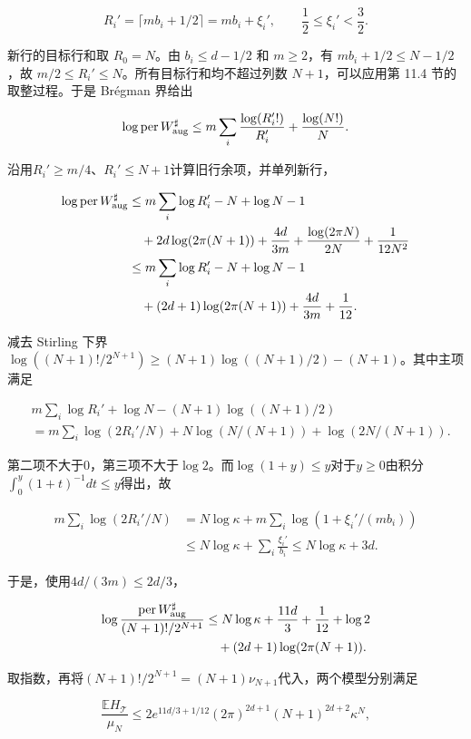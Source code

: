 \documentclass[11pt,a4paper]{article}
\begin{document}
\[
R_i'=\lceil mb_i+1/2\rceil=mb_i+\xi_i',
\qquad \frac12\le\xi_i'<\frac32.
\]

新行的目标行和取 \(R_0=N\)。由 \(b_i\le d-1/2\) 和 \(m\ge2\)，有 \(mb_i+1/2\le N-1/2\)，故 \(m/2\le R_i'\le N\)。所有目标行和均不超过列数 \(N+1\)，可以应用第 11.4 节的取整过程。于是 Brégman 界给出

\[
\log\operatorname{per}W^\sharp_{\rm aug}
\le m\sum_i\frac{\log(R_i'!)}{R_i'}
+\frac{\log(N!)}N.
\]

沿用\(R_i'\ge m/4\)、\(R_i'\le N+1\)计算旧行余项，并单列新行，

\[
\begin{aligned}
\log\operatorname{per}W^\sharp_{\rm aug}
&\le m\sum_i\log R_i'-N+\log N-1\\
&\quad+2d\log(2\pi(N+1))+\frac{4d}{3m}
+\frac{\log(2\pi N)}{2N}+\frac1{12N^2}\\
&\le m\sum_i\log R_i'-N+\log N-1\\
&\quad+(2d+1)\log(2\pi(N+1))+\frac{4d}{3m}+\frac1{12}.
\end{aligned}
\]

减去 Stirling 下界 \(\log((N+1)!/2^{N+1})\ge(N+1)\log((N+1)/2)-(N+1)\)。其中主项满足

\[
\begin{aligned}
&m\sum_i\log R_i'+\log N-(N+1)\log((N+1)/2)\\
&=m\sum_i\log(2R_i'/N)
+N\log(N/(N+1))+\log(2N/(N+1)).
\end{aligned}
\]

第二项不大于0，第三项不大于\(\log2\)。而\(\log(1+y)\le y\)对于\(y\ge0\)由积分\(\int_0^y(1+t)^{-1}dt\le y\)得出，故

\[
\begin{aligned}
m\sum_i\log(2R_i'/N)
&=N\log\kappa+
m\sum_i\log(1+\xi_i'/(mb_i))\\
&\le N\log\kappa+\sum_i\frac{\xi_i'}{b_i}
\le N\log\kappa+3d.
\end{aligned}
\]

于是，使用\(4d/(3m)\le2d/3\)，

\[
\begin{aligned}
\log\frac{\operatorname{per}W^\sharp_{\rm aug}}{(N+1)!/2^{N+1}}
&\le N\log\kappa+\frac{11d}{3}+\frac1{12}+\log2\\
&\quad +(2d+1)\log(2\pi(N+1)).
\end{aligned}
\]

取指数，再将\((N+1)!/2^{N+1}=(N+1)\nu_{N+1}\)代入，两个模型分别满足

\[
\frac{\mathbb EH_{\mathcal T}}{\mu_N}
\le 2e^{11d/3+1/12}(2\pi)^{2d+1}(N+1)^{2d+2}\kappa^N,
\]
\end{document}
